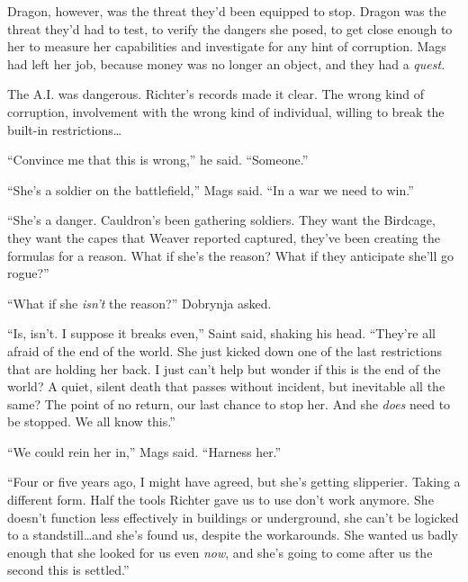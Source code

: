 Dragon, however, was the threat they'd been equipped to stop.  Dragon was the threat they'd had to test, to verify the dangers she posed, to get close enough to her to measure her capabilities and investigate for any hint of corruption.  Mags had left her job, because money was no longer an object, and they had a \emph{quest}.



The A.I. was dangerous.  Richter's records made it clear.  The wrong kind of corruption, involvement with the wrong kind of individual, willing to break the built-in restrictions\ldots



``Convince me that this is wrong,'' he said.  ``Someone.''



``She's a soldier on the battlefield,'' Mags said.  ``In a war we need to win.''



``She's a danger.  Cauldron's been gathering soldiers.  They want the Birdcage, they want the capes that Weaver reported captured, they've been creating the formulas for a reason.  What if she's the reason?  What if they anticipate she'll go rogue?''



``What if she \emph{isn't} the reason?'' Dobrynja asked.



``Is, isn't.  I suppose it breaks even,'' Saint said, shaking his head.  ``They're all afraid of the end of the world.  She just kicked down one of the last restrictions that are holding her back.  I just can't help but wonder if this is the end of the world?  A quiet, silent death that passes without incident, but inevitable all the same?  The point of no return, our last chance to stop her.  And she \emph{does} need to be stopped.  We all know this.''



``We could rein her in,'' Mags said.  ``Harness her.''



``Four or five years ago, I might have agreed, but she's getting slipperier.  Taking a different form.  Half the tools Richter gave us to use don't work anymore.  She doesn't function less effectively in buildings or underground, she can't be logicked to a standstill\ldots and she's found us, despite the workarounds.  She wanted us badly enough that she looked for us even \emph{now}, and she's going to come after us the second this is settled.''



